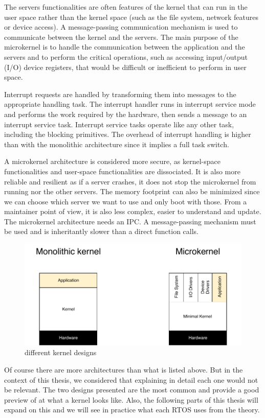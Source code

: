 The servers functionalities are often features of the kernel that can run in the user space
    rather than the kernel space (such as the file system, network features or device access)\cite{survey_resource_mgmt}.
A message-passing communication mechanism is used to communicate between the kernel and the servers.
The main purpose of the microkernel is to handle the communication between the application and the servers
    and to perform the critical operations, such as accessing input/output (I/O) device registers, that would be difficult or inefficient to perform in user space.

Interrupt requests are handled by transforming them into messages to the appropriate handling task.
The interrupt handler runs in interrupt service mode and performs the work required by the hardware, then sends a message to an interrupt service task.
Interrupt service tasks operate like any other task, including the blocking primitives.
The overhead of interrupt handling is higher than with the monolithic architecture since it implies a full task switch.

A microkernel architecture is considered more secure, as kernel-space functionalities and user-space functionalities are dissociated.
It is also more reliable and resilient as if a server crashes, it does not stop the microkernel from running nor the other servers.
The memory footprint can also be minimized since we can choose which server we want to use and only boot with those.
From a maintainer point of view, it is also less complex, easier to understand and update\cite{OS_for_iot}\cite{comparison_iot_constrained_devices}.
The microkernel architecture needs an IPC.
A message-passing mechanism must be used and is inheritantly slower than a direct function calls.
\\
\begin{figure}[!h]
    \centering
    \includegraphics[scale=0.8]{assets/kernel_types.pdf}
    \caption{\label{fig:kernel-types}different kernel designs}
\end{figure}

Of course there are more architectures than what is listed above.
But in the context of this thesis, we considered that explaining in detail each one would not be relevant.
The two designs presented are the most common and provide a good preview of at what a kernel looks like.
Also, the following parts of this thesis will expand on this
    and we will see in practice what each RTOS uses from the theory.
